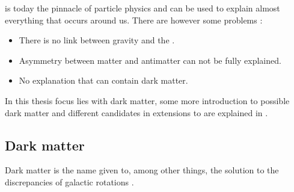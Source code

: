 \abbrSM is today the pinnacle of particle physics and can be used to explain almost everything that occurs around us. There are however some problems \citep{Jungman:1996}:
\begin{itemize}
\item There is no link between gravity and the \abbrSM.
\item Asymmetry between matter and antimatter can not be fully explained.
\item No explanation that can contain dark matter.
\end{itemize} 
In this thesis focus lies with dark matter, some more introduction to possible dark matter and different candidates in extensions to \abbrSM are explained in .


\subsection{Dark matter}\label{sec:tb:subsec:dark}
Dark matter is the name given to, among other things, the solution to the discrepancies of galactic rotations \citep{darkmatter}.

